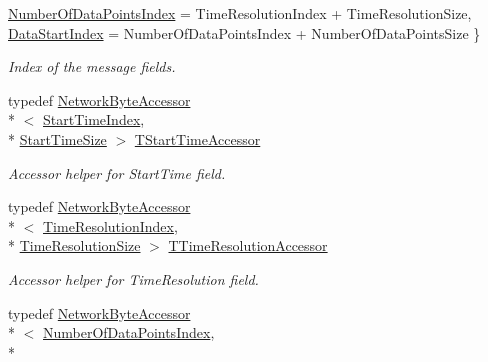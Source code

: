 \begin{DoxyCompactItemize}
\hyperlink{class_terra_swarm_1_1_asynchronous_1_1_client_data_aa673343abbf055d48820fa210064a1dba55c2f5bf31d40f83c6fec0e3943e4985}{Number\-Of\-Data\-Points\-Index} = Time\-Resolution\-Index + Time\-Resolution\-Size, 
\hyperlink{class_terra_swarm_1_1_asynchronous_1_1_client_data_aa673343abbf055d48820fa210064a1dba27bcfe80092d93659e1b03f67c3f3b77}{Data\-Start\-Index} = Number\-Of\-Data\-Points\-Index + Number\-Of\-Data\-Points\-Size
 \}
\begin{DoxyCompactList}\small\item\em Index of the message fields. \end{DoxyCompactList}\item 
typedef \hyperlink{class_terra_swarm_1_1_network_byte_accessor}{Network\-Byte\-Accessor}\\*
$<$ \hyperlink{class_terra_swarm_1_1_asynchronous_1_1_client_data_aa673343abbf055d48820fa210064a1dba01941423451995fbb2656b85f2199b06}{Start\-Time\-Index}, \\*
\hyperlink{class_terra_swarm_1_1_asynchronous_1_1_client_data_ac66a46fcb609d1205cef15f85cd551b0a669ddc8638e4c5d6c0ae519ff59f66c1}{Start\-Time\-Size} $>$ \hyperlink{class_terra_swarm_1_1_asynchronous_1_1_client_data_a9d8f2e887da6bef7fc623b4ca8e2cf57}{T\-Start\-Time\-Accessor}
\begin{DoxyCompactList}\small\item\em Accessor helper for Start\-Time field. \end{DoxyCompactList}\item 
typedef \hyperlink{class_terra_swarm_1_1_network_byte_accessor}{Network\-Byte\-Accessor}\\*
$<$ \hyperlink{class_terra_swarm_1_1_asynchronous_1_1_client_data_aa673343abbf055d48820fa210064a1dba5f51978c66fb63b9b2e7e7fabc6f8b32}{Time\-Resolution\-Index}, \\*
\hyperlink{class_terra_swarm_1_1_asynchronous_1_1_client_data_ac66a46fcb609d1205cef15f85cd551b0ac13dfbedd3bb3241adca682ae0cae309}{Time\-Resolution\-Size} $>$ \hyperlink{class_terra_swarm_1_1_asynchronous_1_1_client_data_acda5940545173f5f000e8eb0fdb8c712}{T\-Time\-Resolution\-Accessor}
\begin{DoxyCompactList}\small\item\em Accessor helper for Time\-Resolution field. \end{DoxyCompactList}\item 
typedef \hyperlink{class_terra_swarm_1_1_network_byte_accessor}{Network\-Byte\-Accessor}\\*
$<$ \hyperlink{class_terra_swarm_1_1_asynchronous_1_1_client_data_aa673343abbf055d48820fa210064a1dba55c2f5bf31d40f83c6fec0e3943e4985}{Number\-Of\-Data\-Points\-Index}, \\*

\end{DoxyCompactItemize}
